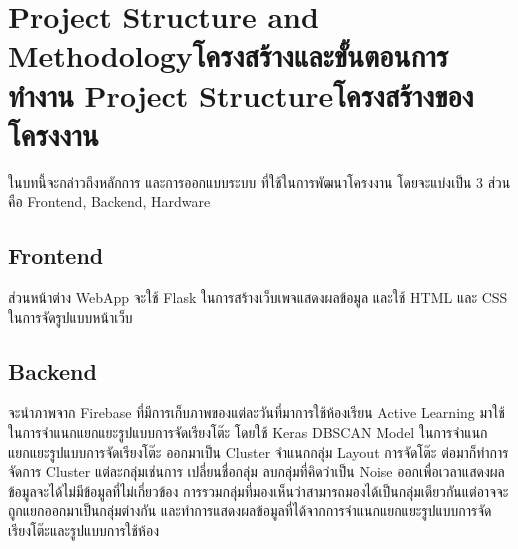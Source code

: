 \chapter{\ifproject%
\ifenglish Project Structure and Methodology\else โครงสร้างและขั้นตอนการทำงาน\fi
\else%
\ifenglish Project Structure\else โครงสร้างของโครงงาน\fi
\fi
}

ในบทนี้จะกล่าวถึงหลักการ และการออกแบบระบบ ที่ใช้ในการพัฒนาโครงงาน โดยจะแบ่งเป็น 3 ส่วน คือ
\enskip Frontend, Backend, Hardware




\section{Frontend}

ส่วนหน้าต่าง WebApp จะใช้ Flask ในการสร้างเว็บเพจแสดงผลข้อมูล และใช้ HTML และ CSS ในการจัดรูปแบบหน้าเว็บ

\section{Backend}

จะนำภาพจาก Firebase ที่มีการเก็บภาพของแต่ละวันที่มาการใช้ห้องเรียน Active Learning มาใช้ในการจำแนกแยกแยะรูปแบบการจัดเรียงโต๊ะ โดยใช้ Keras DBSCAN Model ในการจำแนกแยกแยะรูปแบบการจัดเรียงโต๊ะ
\enskip ออกมาเป็น Cluster จำแนกกลุ่ม Layout การจัดโต๊ะ ต่อมาก็ทำการจัดการ Cluster แต่ละกลุ่มเช่นการ เปลี่ยนชื่อกลุ่ม ลบกลุ่มที่คิดว่าเป็น Noise ออกเพื่อเวลาแสดงผลข้อมูลจะได้ไม่มีข้อมูลที่ไม่เกี่ยวข้อง
\enskip การรวมกลุ่มที่มองเห็นว่าสามารถมองได้เป็นกลุ่มเดียวกันแต่อาจจะถูกแยกออกมาเป็นกลุ่มต่างกัน และทำการแสดงผลข้อมูลที่ได้จากการจำแนกแยกแยะรูปแบบการจัดเรียงโต๊ะและรูปแบบการใช้ห้อง

